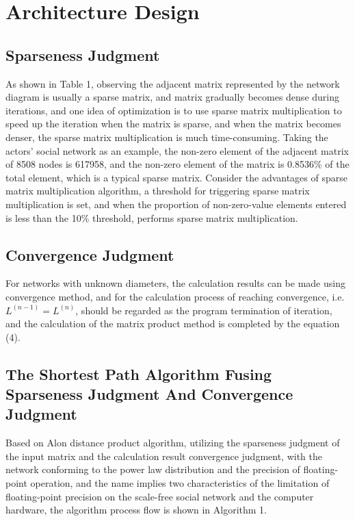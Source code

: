 \documentclass[review]{cvpr}
\begin{document}
\section{Architecture Design}

\subsection{Sparseness Judgment}

As shown in Table 1, observing the adjacent matrix represented by the network diagram is usually a sparse matrix, and matrix gradually becomes dense during iterations,
and one idea of optimization is to use sparse matrix multiplication to speed up the iteration when the matrix is sparse, and when the matrix becomes denser, the sparse matrix multiplication is much time-consuming.
Taking the actors' social network as an example, the non-zero element of the adjacent matrix of 8508 nodes is 617958, and the non-zero element of the matrix is 0.8536\% of the total element,
which is a typical sparse matrix. Consider the advantages of sparse matrix multiplication algorithm, a threshold for triggering sparse matrix multiplication is set,
and when the proportion of non-zero-value elements entered is less than the 10\% threshold, performs sparse matrix multiplication.

\subsection{Convergence Judgment}

For networks with unknown diameters, the calculation results can be made using convergence method, and for the calculation process of reaching convergence,
i.e. $L^{(n-1)}=L^{(n)}$, should be regarded as the program termination of iteration, and the calculation of the matrix product method is completed by the equation (4).

\subsection{The Shortest Path Algorithm Fusing Sparseness Judgment And Convergence Judgment}

Based on Alon \etal distance product algorithm, utilizing the sparseness judgment of the input matrix and the calculation result convergence judgment,
with the network conforming to the power law distribution and the precision of floating-point operation, and the name implies two characteristics of the limitation
of floating-point precision on the scale-free social network and the computer hardware, the algorithm process flow is shown in Algorithm 1.
\end{document}
